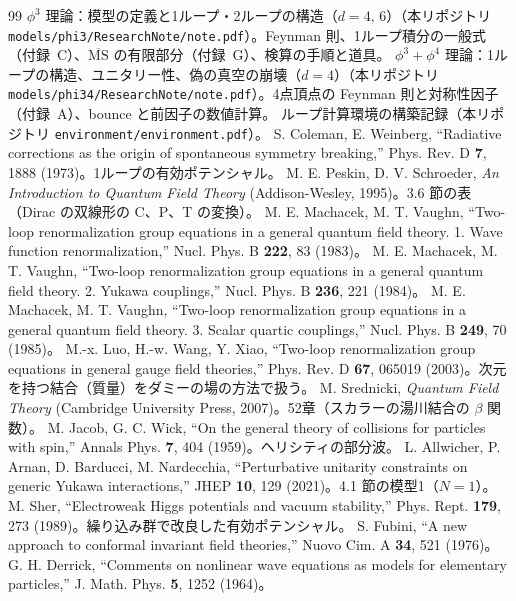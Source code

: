 \documentclass[a4paper,10pt]{ltjsarticle}
\newcommand{\MSbar}{\overline{\mathrm{MS}}}
\begin{document}
\begin{thebibliography}{99}
\small
{} $\phi^3$ 理論：模型の定義と1ループ・2ループの構造（$d=4,\,6$）（本リポジトリ \nolinkurl{models/phi3/ResearchNote/note.pdf}）。Feynman 則、1ループ積分の一般式（付録~C）、$\MSbar$ の有限部分（付録~G）、検算の手順と道具。
 $\phi^3+\phi^4$ 理論：1ループの構造、ユニタリー性、偽の真空の崩壊（$d=4$）（本リポジトリ \nolinkurl{models/phi34/ResearchNote/note.pdf}）。4点頂点の Feynman 則と対称性因子（付録~A）、bounce と前因子の数値計算。
 ループ計算環境の構築記録（本リポジトリ \nolinkurl{environment/environment.pdf}）。
 S. Coleman, E. Weinberg, ``Radiative corrections as the origin of spontaneous symmetry breaking,'' Phys. Rev. D \textbf{7}, 1888 (1973)。1ループの有効ポテンシャル。
 M. E. Peskin, D. V. Schroeder, \textit{An Introduction to Quantum Field Theory} (Addison-Wesley, 1995)。3.6 節の表（Dirac の双線形の C、P、T の変換）。
 M. E. Machacek, M. T. Vaughn, ``Two-loop renormalization group equations in a general quantum field theory. 1. Wave function renormalization,'' Nucl. Phys. B \textbf{222}, 83 (1983)。
 M. E. Machacek, M. T. Vaughn, ``Two-loop renormalization group equations in a general quantum field theory. 2. Yukawa couplings,'' Nucl. Phys. B \textbf{236}, 221 (1984)。
 M. E. Machacek, M. T. Vaughn, ``Two-loop renormalization group equations in a general quantum field theory. 3. Scalar quartic couplings,'' Nucl. Phys. B \textbf{249}, 70 (1985)。
 M.-x. Luo, H.-w. Wang, Y. Xiao, ``Two-loop renormalization group equations in general gauge field theories,'' Phys. Rev. D \textbf{67}, 065019 (2003)。次元を持つ結合（質量）をダミーの場の方法で扱う。
 M. Srednicki, \textit{Quantum Field Theory} (Cambridge University Press, 2007)。52章（スカラーの湯川結合の $\beta$ 関数）。
 M. Jacob, G. C. Wick, ``On the general theory of collisions for particles with spin,'' Annals Phys. \textbf{7}, 404 (1959)。ヘリシティの部分波。
 L. Allwicher, P. Arnan, D. Barducci, M. Nardecchia, ``Perturbative unitarity constraints on generic Yukawa interactions,'' JHEP \textbf{10}, 129 (2021)。4.1 節の模型1（$N=1$）。
 M. Sher, ``Electroweak Higgs potentials and vacuum stability,'' Phys. Rept. \textbf{179}, 273 (1989)。繰り込み群で改良した有効ポテンシャル。
 S. Fubini, ``A new approach to conformal invariant field theories,'' Nuovo Cim. A \textbf{34}, 521 (1976)。
 G. H. Derrick, ``Comments on nonlinear wave equations as models for elementary particles,'' J. Math. Phys. \textbf{5}, 1252 (1964)。

\end{thebibliography}
\end{document}
